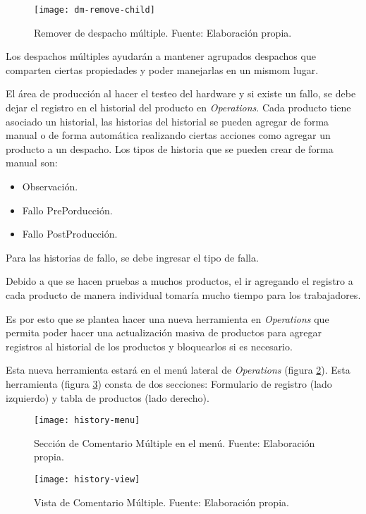 \begin{figure}[H]
	\centering
	\texttt{[image: dm-remove-child]}
	\caption{\label{fig:dm-remove-child} Remover de despacho múltiple. Fuente: Elaboración propia.}
\end{figure}

Los despachos múltiples ayudarán a mantener agrupados despachos que comparten ciertas propiedades y poder manejarlas en un mismom lugar.\fi


El área de producción al hacer el testeo del hardware y si existe un fallo, se debe dejar el registro en el historial del producto en \textit{Operations}.
Cada producto tiene asociado un historial, las historias del historial se pueden agregar de forma manual o de forma automática realizando ciertas acciones como agregar un producto a un despacho.
Los tipos de historia que se pueden crear de forma manual son:
\begin{itemize}
    \item Observación.
    \item Fallo PrePorducción.
    \item Fallo PostProducción.
\end{itemize}

Para las historias de fallo, se debe ingresar el tipo de falla.

Debido a que se hacen pruebas a muchos productos, el ir agregando el registro a cada producto de manera individual tomaría mucho tiempo para los trabajadores.

Es por esto que se plantea hacer una nueva herramienta en \textit{Operations} que permita poder hacer una actualización masiva de productos para agregar registros al historial de los productos y bloquearlos si es necesario.

Esta nueva herramienta estará en el menú lateral de \textit{Operations} (figura \ref{fig:history-menu}). Esta herramienta (figura \ref{fig:history-view}) consta de dos secciones: Formulario de registro (lado izquierdo) y tabla de productos (lado derecho).

\begin{figure}[H]
	\centering
	\texttt{[image: history-menu]}
	\caption{\label{fig:history-menu} Sección de Comentario Múltiple en el menú. Fuente: Elaboración propia.}
\end{figure}

\begin{figure}[H]
	\centering
	\texttt{[image: history-view]}
	\caption{\label{fig:history-view} Vista de Comentario Múltiple. Fuente: Elaboración propia.}
\end{figure}

